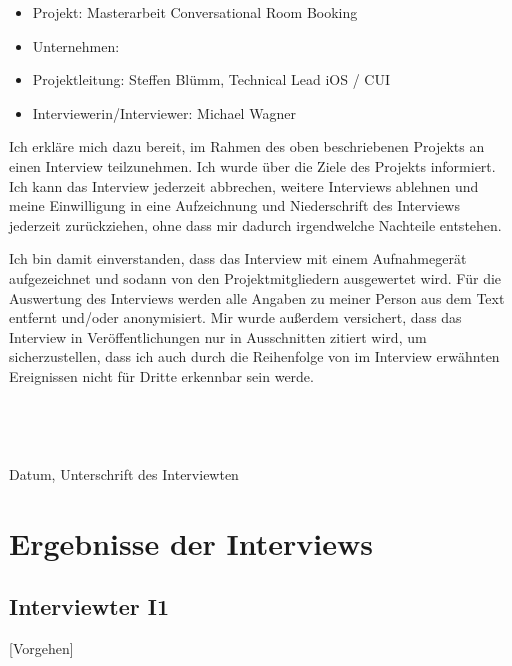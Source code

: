 \begin{itemize}
\item Projekt: Masterarbeit Conversational Room Booking
\item Unternehmen: \adorsys\
\item Projektleitung: Steffen Blümm, Technical Lead iOS / CUI
\item Interviewerin/Interviewer: Michael Wagner
\end{itemize}

Ich erkläre mich dazu bereit, im Rahmen des oben beschriebenen Projekts an einen Interview teilzunehmen. Ich wurde über die Ziele des Projekts informiert. Ich kann das Interview jederzeit abbrechen, weitere Interviews ablehnen und meine Einwilligung in eine Aufzeichnung und Niederschrift des Interviews jederzeit zurückziehen, ohne dass mir dadurch irgendwelche Nachteile entstehen.

Ich bin damit einverstanden, dass das Interview mit einem Aufnahmegerät aufgezeichnet und sodann von den Projektmitgliedern ausgewertet wird. Für die Auswertung des Interviews werden alle Angaben zu meiner Person aus dem Text entfernt und/oder anonymisiert. Mir wurde außerdem versichert, dass das Interview in Veröffentlichungen nur in Ausschnitten zitiert wird, um sicherzustellen, dass ich auch durch die Reihenfolge von im Interview erwähnten Ereignissen nicht für Dritte erkennbar sein werde. \\ \\ \\ \\ \\

Datum, Unterschrift des Interviewten

\clearpage

\section{Ergebnisse der Interviews}
\label{sec:anhang-interview-auswertung}

\subsection{Interviewter I1}
\label{subsec:interview-i1}

[Vorgehen]

